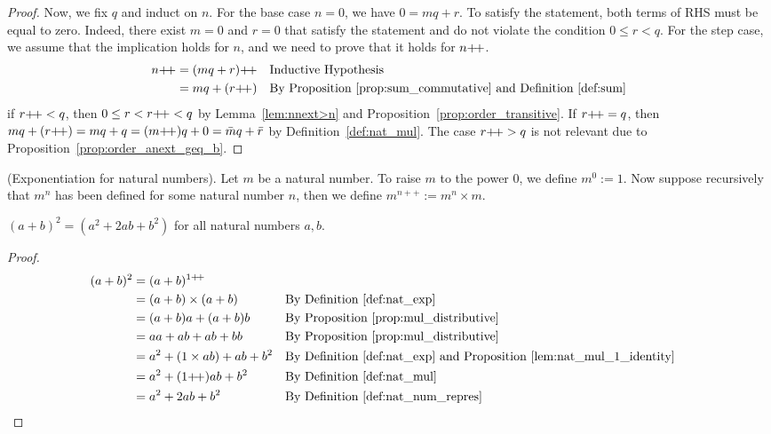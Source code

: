\begin{proof}
     Now, we fix $q$ and induct on $n$. For the base case $n=0$, we have $0 = mq + r$. To satisfy the statement, both terms of RHS must be equal to zero. Indeed, there exist $m=0$ and $r=0$ that satisfy the statement and do not violate the condition $0\leq r < q$. For the step case, we assume that the implication holds for $n$, and we need to prove that it holds for $n\operatorname{\!+\!+}$.
     \begin{align*}
        n\operatorname{\!+\!+} &= (mq + r)\operatorname{\!+\!+} && \text{Inductive Hypothesis}\\
        &= mq + (r\operatorname{\!+\!+}) && \text{By Proposition~\ref{prop:sum_commutative} and Definition~\ref{def:sum}}
     \end{align*}
     if $r\operatorname{\!+\!+} < q$, then $0\leq r<r\operatorname{\!+\!+}< q$ by Lemma~\ref{lem:nnext>n} and Proposition~\ref{prop:order_transitive}. If $r\operatorname{\!+\!+} = q$, then $mq + (r\operatorname{\!+\!+})= mq + q = (m\operatorname{\!+\!+})q + 0 = \bar{m}q + \bar{r}$ by Definition~\ref{def:nat_mul}. The case $r\operatorname{\!+\!+} > q$ is not relevant due to Proposition~\ref{prop:order_anext_geq_b}.
\end{proof}

\begin{definition}
    \textup{(Exponentiation for natural numbers)}. Let $m$ be a natural number. To raise $m$ to the power $0$, we define $m^0 :=1$. Now suppose recursively that $m^n$ has been defined for some natural number $n$, then we define $m^{n++} := m^n \times m$.\label{def:nat_exp}
\end{definition}

\begin{proposition}
    $(a + b)^2 = (a^2 + 2ab + b^2)$ for all natural numbers $a, b$.
\end{proposition}
\begin{proof}
    \begin{align*}
        (a+b)^2 &= (a+b)^{1\operatorname{\!+\!+}}\\
        &= (a+b)\times(a+b) && \text{By Definition~\ref{def:nat_exp}}\\
        &= (a+b)a + (a+b)b && \text{By Proposition~\ref{prop:mul_distributive}}\\
        &= aa + ab + ab + bb && \text{By Proposition~\ref{prop:mul_distributive}}\\
        &= a^2 + (1\times ab) + ab + b^2 && \text{By Definition~\ref{def:nat_exp} and Proposition~\ref{lem:nat_mul_1_identity}}\\
        &= a^2 + (1\operatorname{\!+\!+})ab + b^2 && \text{By Definition~\ref{def:nat_mul}}\\
        &= a^2 + 2ab + b^2 && \text{By Definition~\ref{def:nat_num_repres}}\\
    \end{align*}
\end{proof}


